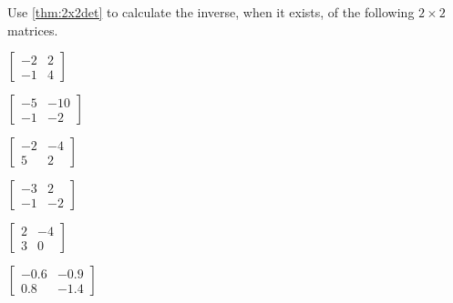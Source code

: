 \begin{exercise} \label{ex:2x2det} 
Use \autoref{thm:2x2det} to calculate the inverse, when it exists, of the following \(2\times2\) matrices.
\begin{parts}
\item \(\begin{bmatrix} -2&2
\\-1&4 \end{bmatrix}\)

\item \(\begin{bmatrix} -5&-10
\\-1&-2 \end{bmatrix}\)

\item \(\begin{bmatrix} -2&-4
\\5&2 \end{bmatrix}\)

\item \(\begin{bmatrix} -3&2
\\-1&-2 \end{bmatrix}\)

\item \(\begin{bmatrix} 2&-4
\\3&0 \end{bmatrix}\)

\item \(\begin{bmatrix} -0.6&-0.9
\\0.8&-1.4 \end{bmatrix}\)


\end{parts}
\end{exercise}
